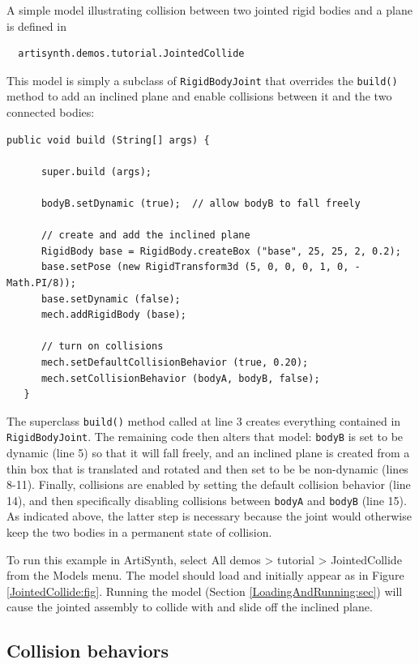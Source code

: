 A simple model illustrating collision between two jointed rigid bodies
and a plane is defined in
%
\begin{verbatim}
  artisynth.demos.tutorial.JointedCollide
\end{verbatim}
%

This model is simply a subclass of {\tt RigidBodyJoint} that
overrides the {\tt build()} method 
to add an inclined plane and enable collisions between it and
the two connected bodies:
%
\lstset{numbers=left}
\begin{lstlisting}[]
   public void build (String[] args) {

      super.build (args);

      bodyB.setDynamic (true);  // allow bodyB to fall freely

      // create and add the inclined plane
      RigidBody base = RigidBody.createBox ("base", 25, 25, 2, 0.2);
      base.setPose (new RigidTransform3d (5, 0, 0, 0, 1, 0, -Math.PI/8));
      base.setDynamic (false);
      mech.addRigidBody (base);

      // turn on collisions
      mech.setDefaultCollisionBehavior (true, 0.20);
      mech.setCollisionBehavior (bodyA, bodyB, false);
   }
\end{lstlisting}
\lstset{numbers=none}

The superclass {\tt build()} method called at line 3 creates
everything contained in {\tt RigidBodyJoint}. The remaining code then
alters that model: {\tt bodyB} is set to be dynamic (line 5) so that
it will fall freely, and an inclined plane is created from a thin box
that is translated and rotated and then set to be be non-dynamic
(lines 8-11).  Finally, collisions are enabled by setting the default
collision behavior (line 14), and then specifically disabling
collisions between {\tt bodyA} and {\tt bodyB} (line 15). As indicated
above, the latter step is necessary because the joint would otherwise
keep the two bodies in a permanent state of collision.

To run this example in ArtiSynth, select {\sf All demos > tutorial >
JointedCollide} from the {\sf Models} menu. The model should load and
initially appear as in Figure \ref{JointedCollide:fig}.  Running
the model (Section \ref{LoadingAndRunning:sec}) will
cause the jointed assembly to collide with and slide off the inclined
plane.

\subsection{Collision behaviors}
\label{collisionBehavior:sec}

